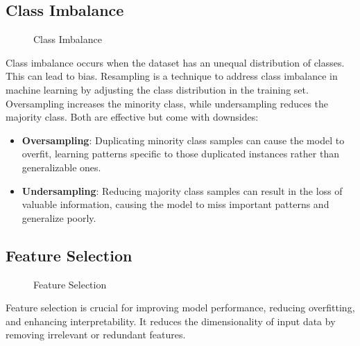 \documentclass{article}
\begin{document}
\subsection{Class Imbalance}
\begin{figure}[h]
\centering
{}
    \caption{Class Imbalance}
    \label{fig:regression_example}
\end{figure}
Class imbalance occurs when the dataset has an unequal distribution of classes. This can lead to bias. Resampling is a technique to address class imbalance in machine learning by adjusting the class distribution in the training set. Oversampling increases the minority class, while undersampling reduces the majority class. Both are effective but come with downsides: 
\begin{itemize}
    \item \textbf{Oversampling}: Duplicating minority class samples can cause the model to overfit, learning patterns specific to those duplicated instances rather than generalizable ones.
    
    \item \textbf{Undersampling}: Reducing majority class samples can result in the loss of valuable information, causing the model to miss important patterns and generalize poorly.
\end{itemize}

\subsection{Feature Selection}
\begin{figure}[h]
\centering
{}
    \caption{Feature Selection}
    \label{fig:regression_example}
\end{figure}
Feature selection is crucial  for improving model performance, reducing overfitting, and enhancing interpretability. It reduces the dimensionality of input data by removing irrelevant or redundant features.
\end{document}
